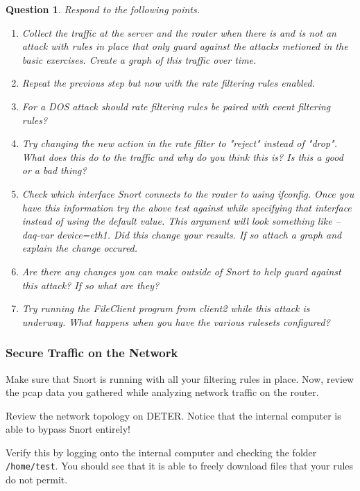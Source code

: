 \documentclass[a4paper,11pt,hidelinks]{article}
\newtheorem{theorem}{Question}[subsection]
\begin{document}
\begin{theorem}
    Respond to the following points.
    \begin{enumerate}
        \item Collect the traffic at the server and the router when there is and is not an attack with rules in place that only guard against the attacks metioned in the basic exercises. Create a graph of this traffic over time.
        \item Repeat the previous step but now with the rate filtering rules enabled.
        \item For a DOS attack should rate filtering rules be paired with event filtering rules?
        \item Try changing the new action in the rate filter to "reject" instead of "drop". What does this do to the traffic and why do you think this is? Is this a good or a bad thing?
        \item Check which interface Snort connects to the router to using ifconfig. Once you have this information try the above test against while specifying that interface instead of using the default value. This argument will look something like --daq-var device=eth1. Did this change your results. If so attach a graph and explain the change occured.
        \item Are there any changes you can make outside of Snort to help guard against this attack? If so what are they?
        \item Try running the FileClient program from client2 while this attack is underway. What happens when you have the various rulesets configured?
    \end{enumerate}
\end{theorem}


\subsubsection{Secure Traffic on the Network}

Make sure that Snort is running with all your filtering rules in place. Now, review the pcap data you gathered while analyzing network traffic on the router.

Review the network topology on DETER. Notice that the internal computer is able to bypass Snort entirely!

Verify this by logging onto the internal computer and checking the folder \verb=/home/test=. You should see that it is able to freely download files that your rules do not permit.
\end{document}
